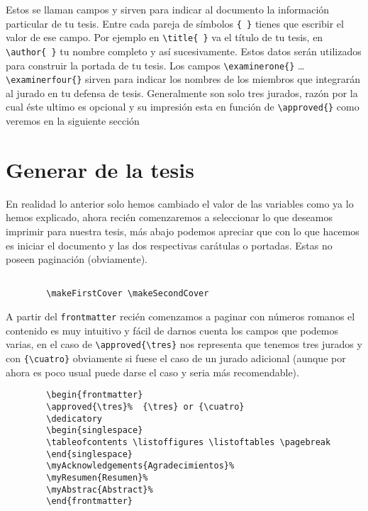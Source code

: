 Estos se llaman campos y sirven para indicar al documento la
información particular de tu tesis. Entre cada pareja de símbolos
\verb"{ }" tienes que escribir el valor de ese campo. Por ejemplo
en \verb"\title{ }" va el título de tu tesis, en \verb"\author{ }"
tu nombre completo y así sucesivamente. Estos datos serán
utilizados para construir la portada de tu tesis. Los campos
\verb"\examinerone{}" \ldots \verb"\examinerfour{}" sirven para
indicar los nombres de los miembros que integrarán al jurado en tu
defensa de tesis. Generalmente son solo tres jurados, razón por la
cual éste ultimo es opcional y su impresión esta en función de
\verb"\approved{}" como veremos en la siguiente sección

\section{Generar de la tesis}

En realidad lo anterior solo hemos cambiado el valor de las
variables como ya lo hemos explicado, ahora recién comenzaremos a
seleccionar lo que deseamos imprimir para nuestra tesis, más abajo
podemos apreciar que con \verb"" lo que hacemos es
iniciar el documento y las dos respectivas carátulas o portadas.
Estas no poseen paginación (obviamente).

\begin{singlespace}
\begin{verbatim}
        
        \makeFirstCover \makeSecondCover
\end{verbatim}
\end{singlespace}

A partir del \verb"frontmatter" recién comenzamos a paginar con
números romanos el contenido es muy intuitivo y fácil de darnos
cuenta los campos que podemos varias, en el caso de
\verb"\approved{\tres}" nos representa que tenemos tres jurados y
con \verb"{\cuatro}" obviamente si fuese el caso de un jurado
adicional (aunque por ahora es poco usual puede darse el caso y
seria más recomendable).

\begin{singlespace}
\begin{verbatim}
        \begin{frontmatter}
        \approved{\tres}%  {\tres} or {\cuatro}
        \dedicatory
        \begin{singlespace}
        \tableofcontents \listoffigures \listoftables \pagebreak
        \end{singlespace}
        \myAcknowledgements{Agradecimientos}%
        \myResumen{Resumen}%
        \myAbstrac{Abstract}%
        \end{frontmatter}
\end{verbatim}
\end{singlespace}

